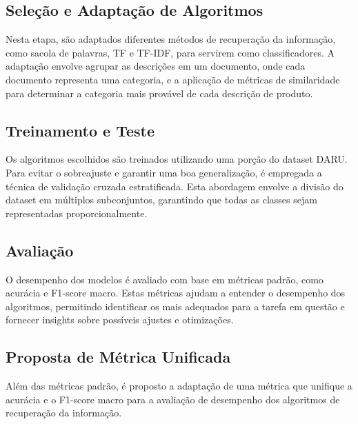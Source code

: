\subsection{Seleção e Adaptação de Algoritmos}
Nesta etapa, são adaptados diferentes métodos de recuperação da informação, como sacola de palavras, TF e TF-IDF, para servirem como classificadores. A adaptação envolve agrupar as descrições em um documento, onde cada documento representa uma categoria, e a aplicação de métricas de similaridade para determinar a categoria mais provável de cada descrição de produto.

\subsection{Treinamento e Teste}
Os algoritmos escolhidos são treinados utilizando uma porção do dataset DARU. Para evitar o sobreajuste e garantir uma boa generalização, é empregada a técnica de validação cruzada estratificada. Esta abordagem envolve a divisão do dataset em múltiplos subconjuntos, garantindo que todas as classes sejam representadas proporcionalmente.

\subsection{Avaliação}
O desempenho dos modelos é avaliado com base em métricas padrão, como acurácia e F1-score macro. Estas métricas ajudam a entender o desempenho dos algoritmos, permitindo identificar os mais adequados para a tarefa em questão e fornecer insights sobre possíveis ajustes e otimizações.

\subsection{Proposta de Métrica Unificada}
Além das métricas padrão, é proposto a adaptação de uma métrica que unifique a acurácia e o F1-score macro para a avaliação de desempenho dos algoritmos de recuperação da informação.




